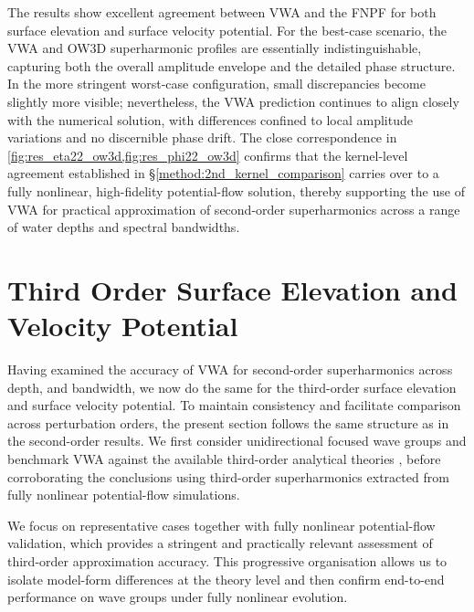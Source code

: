 \documentclass[lineno]{JFM-FLM_Au}
\begin{document}
The results show excellent agreement between VWA and the FNPF for both surface elevation and surface velocity potential. For the best-case scenario, the VWA and OW3D superharmonic profiles are essentially indistinguishable, capturing both the overall amplitude envelope and the detailed phase structure. In the more stringent worst-case configuration, small discrepancies become slightly more visible; nevertheless, the VWA prediction continues to align closely with the numerical solution, with differences confined to local amplitude variations and no discernible phase drift. The close correspondence in \cref{fig:res_eta22_ow3d,fig:res_phi22_ow3d} confirms that the kernel-level agreement established in \S\ref{method:2nd_kernel_comparison} carries over to a fully nonlinear, high-fidelity potential-flow solution, thereby supporting the use of VWA for practical approximation of second-order superharmonics across a range of water depths and spectral bandwidths.




\section{Third Order Surface Elevation and Velocity Potential}\label{sec:thirdorderresult}

Having examined the accuracy of VWA for second-order superharmonics across depth, and bandwidth, we now do the same for the third-order surface elevation and surface velocity potential. To maintain consistency and facilitate comparison across perturbation orders, the present section follows the same structure as in the second-order results. We first consider unidirectional focused wave groups and benchmark VWA against the available third-order analytical theories \cite{madsen2006third,madsen2012third}, before corroborating the conclusions using third-order superharmonics extracted from fully nonlinear potential-flow simulations. 

We focus on representative cases together with fully nonlinear potential-flow validation, which provides a stringent and practically relevant assessment of third-order approximation accuracy. This progressive organisation allows us to isolate model-form differences at the theory level and then confirm end-to-end performance on wave groups under fully nonlinear evolution.
\end{document}
